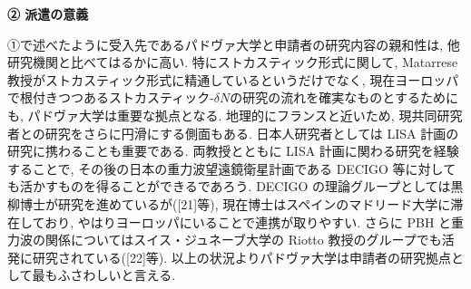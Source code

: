 \documentclass[11pt,a4paper,uplatex,twoside,dvipdfmx]{ujarticle} 	%
\newcommand{\研究課題名}{\mgfamily ストカスティック形式、原始ブラックホール、重力波観測から迫るインフレーション}
\newcommand{\研究機関名}{\mgfamily 名古屋大学}
\newcommand{\申請者氏名}{\mgfamily 多田 祐一郎}
\newcommand{\研究代表者氏名}{\申請者氏名}
\newcommand{\研究期間の最終元号年度}{34}	%
\begin{document}
{	
	
	\begin{mdframed}[roundcorner=0.5zw,
	innertopmargin=0.8zw,innerbottommargin=0.8zw,
	linecolor=black!50,linewidth=0.2zw,
	backgroundcolor=black!10]
	{\bfseries\gtfamily\sffamily\large ② 派遣の意義}
	\end{mdframed}
	
	\vspace{-10pt}
	①で述べたように受入先であるパドヴァ大学と申請者の研究内容の親和性は, 他研究機関と比べてはるかに高い.
	特にストカスティック形式に関して, Matarrese 教授がストカスティック形式に精通しているというだけでなく,
	現在ヨーロッパで根付きつつあるストカスティック-$\delta N$の研究の流れを確実なものとするためにも,
	パドヴァ大学は重要な拠点となる. 地理的にフランスと近いため, 現共同研究者との研究をさらに円滑にする側面もある.
	日本人研究者としては LISA 計画の研究に携わることも重要である.
	両教授とともに LISA 計画に関わる研究を経験することで, その後の日本の重力波望遠鏡衛星計画である DECIGO 等に対しても活かすものを得ることができるであろう.
	DECIGO の理論グループとしては黒柳博士が研究を進めているが([21]等), 現在博士はスペインのマドリード大学に滞在しており, やはりヨーロッパにいることで連携が取りやすい.
	さらに PBH と重力波の関係についてはスイス・ジュネーブ大学の Riotto 教授のグループでも活発に研究されている([22]等).
	以上の状況よりパドヴァ大学は申請者の研究拠点として最もふさわしいと言える.
	
	
	
}
\end{document}
